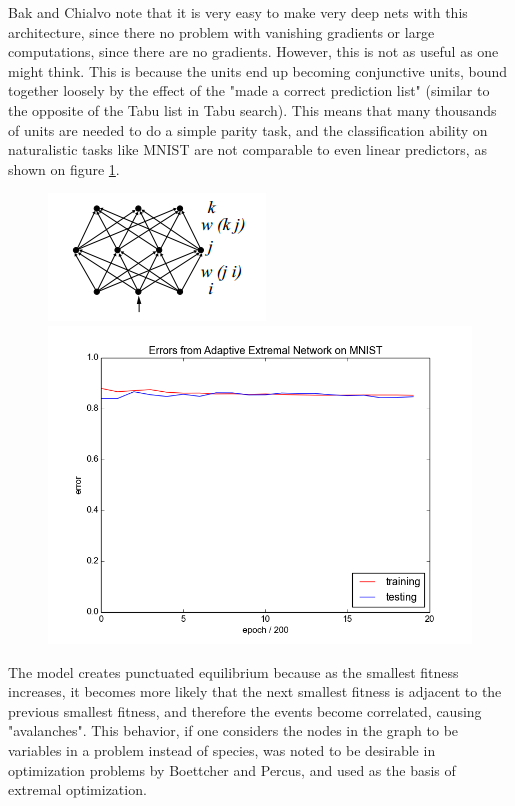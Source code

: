 \documentclass[12pt]{article}
\begin{document}
Bak and Chialvo note that it is very easy to make very deep nets with this architecture, since there no problem with vanishing gradients or large computations, since there are no gradients. However, this is not as useful as one might think. This is because the units end up becoming conjunctive units, bound together loosely by the effect of the "made a correct prediction list" (similar to the opposite of the Tabu list in Tabu search). This means that many thousands of units are needed to do a simple parity task, and the classification ability on naturalistic tasks like MNIST are not comparable to even linear predictors, as shown on figure \ref{fig:baknet_res}.

\begin{figure}
  \includegraphics{bak_chialvo_net_topology}
  \includegraphics{bak_plot}
  \label{fig:baknet_res}
\end{figure}

The model creates punctuated equilibrium because as the smallest fitness increases, it becomes more likely that the next smallest fitness is adjacent to the previous smallest fitness, and therefore the events become correlated, causing "avalanches". This behavior, if one considers the nodes in the graph to be variables in a problem instead of species, was noted to be desirable in optimization problems by Boettcher and Percus, and used as the basis of extremal optimization.
\end{document}
